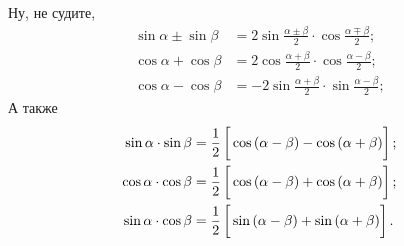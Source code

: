 \noindent
Ну, не судите,
\begin{align*}
    \sin \alpha \pm \sin \beta &= 2 \sin \frac{\alpha \pm \beta}{2} \cdot \cos \frac{\alpha \mp \beta}{2}; \\
    \cos \alpha + \cos \beta &= 2 \cos \frac{\alpha + \beta}{2} \cdot \cos \frac{\alpha - \beta}{2}; \\
    \cos \alpha - \cos \beta &= - 2 \sin \frac{\alpha + \beta}{2} \cdot \sin \frac{\alpha - \beta}{2}; 
\end{align*}
А также
\begin{align*}
    \sin \alpha \cdot \sin \beta &= \frac{1}{2} \left[
    \vphantom{\frac{1}{2}}
        \cos \left(\alpha - \beta\right) - \cos \left(\alpha + \beta\right)
    \right]; \\
    \cos \alpha \cdot \cos \beta &= \frac{1}{2} \left[
    \vphantom{\frac{1}{2}}
        \cos \left(\alpha - \beta\right) + \cos \left(\alpha + \beta\right)
    \right]; \\
    \sin \alpha \cdot \cos \beta &= \frac{1}{2} \left[
    \vphantom{\frac{1}{2}}
        \sin \left(\alpha - \beta\right) + \sin \left(\alpha + \beta\right)
    \right]. \\
\end{align*}